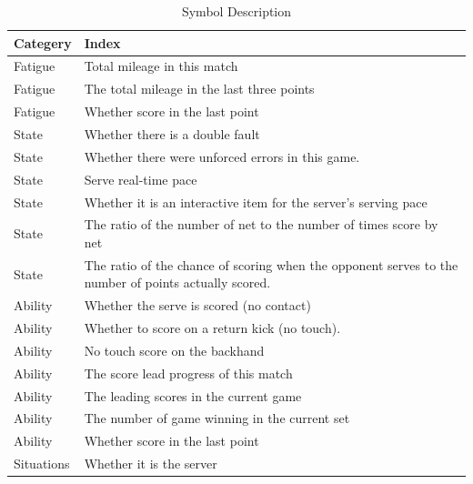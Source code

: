 \documentclass[12pt]{article}
\begin{document}
\begin{table}[H]
      \centering
      \begin{tabular}{|>{\centering\arraybackslash}m{2.5cm}|p{}|}
      \hline
      \textbf{Categery} & \textbf{Index} \\ \hline
      Fatigue &  Total mileage in this match\\ \hline
      Fatigue &  The total mileage in the last three points \\ \hline
      Fatigue &  Whether score in the last point \\ \hline
      State & Whether there is a double fault \\ \hline
      State & Whether there were unforced errors in this game.\\ \hline
      State & Serve real-time pace  \\ \hline
      State & Whether it is an interactive item for the server's serving pace\\ \hline
      State &  The ratio of the number of net to the number of times score by net\\ \hline
      State & The ratio of the chance of scoring when the opponent serves to the number of points actually scored.\\ \hline
      Ability& Whether the serve is scored (no contact) \\ \hline
      Ability& Whether to score on a return kick (no touch). \\ \hline
      Ability& No touch score on the backhand \\ \hline
      Ability& The score lead progress of this match\\ \hline
      Ability& The leading scores in the current game \\ \hline
      Ability& The number of game winning in the current set \\ \hline
      Ability& Whether score in the last point \\ \hline
      Situations& Whether it is the server \\ \hline
      \end{tabular}
      \caption{Symbol Description}
\end{table}
\end{document}

